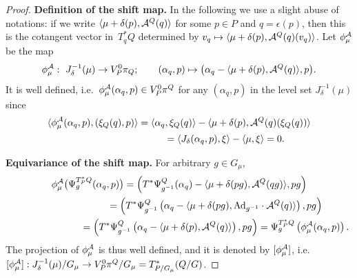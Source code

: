 \documentclass[pdftex]{sigma}
\newcommand{\A}{{\cal A}}
\newcommand{\e}{\epsilon}
\begin{document}
\begin{proof}
{\bf Def\/inition of the shift map.} In the following we use a slight abuse of notations: if we write $\langle \mu+\delta(p),\A^Q(q)\rangle$ for some $p\in P$ and $q=\e(p)$, then this is the cotangent vector in~$T_q^*Q$ determined by $v_q\mapsto \langle \mu+\delta(p),\A^Q(q)(v_q)\rangle$. Let $\phi_\mu^{\A}$ be the map
\[\phi_\mu^\A:\ J_\delta^{-1}(\mu) \to V^0_P\pi_Q; \qquad (\alpha_q,p) \mapsto \big(\alpha_q-\langle \mu+\delta(p),\A^Q(q)\rangle,p\big).\] It is well def\/ined, i.e.\ $\phi^\A_\mu(\alpha_q,p)\in V^0_P\pi^Q$ for any $(\alpha_q,p)$ in the level set $J_\delta^{-1}(\mu)$ since
\begin{gather*}
\langle \phi_\mu^{\A}(\alpha_q,p),(\xi_Q(q),p)\rangle   = \langle \alpha_q, \xi_Q(q)\rangle - \langle \mu+\delta(p),\A^Q(q)(\xi_Q(q))\rangle \\
 \phantom{\langle \phi_\mu^{\A}(\alpha_q,p),(\xi_Q(q),p)\rangle}= \langle J_\delta(\alpha_q,p),\xi\rangle - \langle \mu,\xi\rangle =0.
 \end{gather*}

{\bf Equivariance of the shift map.} For arbitrary $g\in G_\mu$, \begin{gather*}
\phi_\mu^{\A}\big(\Psi^{T_P^*Q}_g(\alpha_q,p)\big)  = \left(T^*\Psi^{Q}_{g^{-1}}(\alpha_q) - \langle \mu+\delta(pg) , \A^Q (qg) \rangle ,pg\right)\\
\phantom{\phi_\mu^{\A}(\Psi^{T_P^*Q}_g(\alpha_q,p))}{}
=  \left(T^*\Psi^{Q}_{g^{-1}}\left(\alpha_q - \langle \mu+\delta(pg) , {\rm Ad}_{g^{-1}}\cdot \A^Q(q)\rangle\right),pg\right)\\
\phantom{\phi_\mu^{\A}(\Psi^{T_P^*Q}_g(\alpha_q,p))}{}
= \left( T^*\Psi^{Q}_{g^{-1}}\left(\alpha_q - \langle \mu+\delta(p),\A^Q(q)\rangle\right),pg\right) = \Psi^{T_P^*Q}_g\left(\phi^\A_\mu(\alpha_q,p)\right).
\end{gather*}The projection of $\phi_\mu^{\A}$ is thus well def\/ined, and it is denoted by $[\phi_\mu^\A]$, i.e.\ $[\phi_\mu^\A]:J^{-1}_\delta(\mu)/G_\mu \to V^0_P \pi^Q/G_\mu=T^*_{P/G_\mu}(Q/G)$.
 \end{proof}
\end{document}
